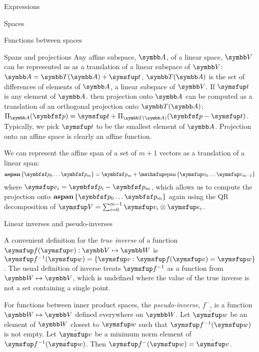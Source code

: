 \documentclass[12pt]{PalisadesLakesArticle}
\begin{document}
\begin{plSection}{Expressions}
\begin{plSection}{Spaces}
\begin{plSection}{Functions between spaces}
\begin{plSection}{Spans and projections}
Any affine subspace, $\Space{A}$, of a linear space, $\Space{V}$ can be represented as
as a translation of a linear subspace of $\Space{V}$:
$\Space{A} = \Space{T}(\Space{A}) + \Vector{t}$,
$\Space{T}(\Space{A})$ is the set of differences of elements of $\Space{A}$,
a linear subspace of $\Space{V}$.
If $\Vector{t}$ is any element of $\Space{A}$.
then projection onto $\Space{A}$
can be computed as a translation of an orthogonal projection onto $\Space{T}(\Space{A})$:
$\Projection_{\Space{A}} (\Point{p}) = \Vector{t} + \Projection_{\Space{T}(\Space{A})} (\Point{p} - \Vector{t})$.
Typically, we pick $\Vector{t}$ to be the smallest element of $\Space{A}$.
Projection onto an affine space is clearly an affine function.

We can represent the affine span of a set of $m+1$ vectors
as a translation of a linear span:
\begin{equation}
\affinespan\left\{ \Point{p}_0 \ldots \Point{p}_{m} \right\} = \Point{p}_m + \linearspan\left\{\Vector{v}_0 \ldots \Vector{v}_{m-1}\right\}
\end{equation}
where $\Vector{v}_i = \Point{p}_i - \Point{p}_m$,
which allows us to compute the projection onto
$\affinespan\left\{ \Point{p}_0 \ldots \Point{p}_{m} \right\}$
again using the QR decomposition
of $\Vector{V} = \sum_{i=0}^{m-1} \Vector{v}_i \otimes \Vector{e}_i$.

\end{plSection}%
\begin{plSection}{Linear inverses and pseudo-inverses}
\label{sec:Linear-inverses-and-pseudo-inverses}

A convenient definition for the \textit{true inverse}
of a function $\Vector{f}(\Vector{v}):\Space{V} \mapsto \Space{W}$ is
$\Vector{f}^{-1}(\Vector{w}) = \left\{ \Vector{v} : \Vector{f}(\Vector{v}) = \Vector{w} \right\}$.
The usual definition of inverse treats $\Vector{f}^{-1}$
as a function from $\Space{W} \mapsto \Space{V}$,
which is undefined where the value of the true
inverse is not a set containing a single point.

For functions between inner product spaces,
the \textit{pseudo-inverse}, $f^{-}$, is a function $\Space{W} \mapsto \Space{V}$
defined everywhere on $\Space{W}$.
Let $\hat{\Vector{w}}$ be an element of $\Space{W}$ closest to $\Vector{w}$
such that $\Vector{f}^{-1}(\Vector{w})$ is not empty.
Let $\hat{\Vector{v}}$ be a minimum norm element of $\Vector{f}^{-1}(\hat{\Vector{w}})$.
Then $\Vector{f}^{-}(\Vector{w}) = \hat{\Vector{v}}$.


\end{plSection}
\end{plSection}
\end{plSection}
\end{plSection}
\end{document}
